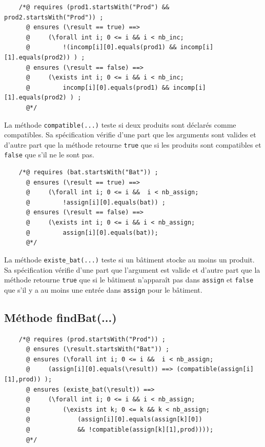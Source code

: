 \documentclass{article}
\begin{document}
\noindent
\begin{verbatim}
    /*@ requires (prod1.startsWith("Prod") && prod2.startsWith("Prod")) ;
      @ ensures (\result == true) ==>
      @     (\forall int i; 0 <= i && i < nb_inc;
      @	        !(incomp[i][0].equals(prod1) && incomp[i][1].equals(prod2)) ) ;
      @ ensures (\result == false) ==>
      @	    (\exists int i; 0 <= i && i < nb_inc; 
      @	        incomp[i][0].equals(prod1) && incomp[i][1].equals(prod2) ) ;
      @*/
\end{verbatim}
\vspace{0.2cm}

\noindent
La méthode \texttt{compatible(...)} teste si deux produits sont déclarés comme compatibles. Sa spécification vérifie d'une part que les arguments sont valides et d'autre part que la méthode retourne \texttt{true} que si les produits sont compatibles et \texttt{false} que s'il ne le sont pas.

\vspace{0.3cm}
\noindent
\begin{verbatim}
    /*@ requires (bat.startsWith("Bat")) ;
      @ ensures (\result == true) ==>
      @	    (\forall int i; 0 <= i &&  i < nb_assign;
      @	        !assign[i][0].equals(bat)) ;
      @ ensures (\result == false) ==>
      @     (\exists int i; 0 <= i && i < nb_assign;
      @	        assign[i][0].equals(bat)); 
      @*/
\end{verbatim}
\vspace{0.2cm}

\noindent
La méthode \texttt{existe\_bat(...)} teste si un bâtiment stocke au moins un produit. Sa spécification vérifie d'une part que l'argument est valide et d'autre part que la méthode retourne \texttt{true} que si le bâtiment n'apparaît pas dans \texttt{assign} et \texttt{false} que s'il y a au moins une entrée dans \texttt{assign} pour le bâtiment.

\subsection{Méthode findBat(...)}

\noindent
\begin{verbatim}
    /*@ requires (prod.startsWith("Prod")) ;
      @ ensures (\result.startsWith("Bat")) ;
      @ ensures (\forall int i; 0 <= i &&  i < nb_assign;
      @	    (assign[i][0].equals(\result)) ==> (compatible(assign[i][1],prod)) );
      @ ensures (existe_bat(\result)) ==>
      @	    (\forall int i; 0 <= i && i < nb_assign;
      @	        (\exists int k; 0 <= k && k < nb_assign;
      @	            (assign[i][0].equals(assign[k][0])
      @             && !compatible(assign[k][1],prod))));
      @*/
\end{verbatim}
\vspace{0.2cm}
\end{document}
